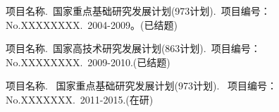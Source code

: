 \begin{project}
	\renewcommand{\currentchapter}{附录3 攻读博士学位期间参与的科研项目}
\item 项目名称.~国家重点基础研究发展计划(973计划).~项目编号：No.XXXXXXXX.~2004-2009。(已结题)
\item
    项目名称.~国家高技术研究发展计划(863计划).~项目编号：No.XXXXXXXX.~2009-2010.(已结题)
\item
    项目名称. ~国家重点基础研究发展计划(973计划). ~项目编号：No.XXXXXXX.~2011-2015.(在研)
\end{project} 
